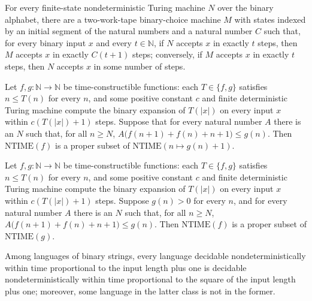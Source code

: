 \begin{theorem}
\label{Turing.FinNDTM.exists_codeNDTM_accepts_linear}
\leanok
{}
For every finite-state nondeterministic Turing machine $N$ over the binary alphabet,
there are a two-work-tape binary-choice machine $M$ with states indexed by an initial
segment of the natural numbers and a natural number $C$ such that, for every binary
input $x$ and every $t\in\mathbb{N}$, if $N$ accepts $x$ in exactly $t$ steps, then $M$
accepts $x$ in exactly $C(t+1)$ steps; conversely, if $M$ accepts $x$ in exactly $t$
steps, then $N$ accepts $x$ in some number of steps.
\end{theorem}

\begin{theorem}
\label{Complexity.ntime_hierarchy}
\leanok
{}
Let $f,g:\mathbb{N}\to\mathbb{N}$ be time-constructible functions: each $T\in\{f,g\}$
satisfies $n\le T(n)$ for every $n$, and some positive constant $c$ and finite
deterministic Turing machine compute the binary expansion of $T(|x|)$ on every input $x$
within $c(T(|x|)+1)$ steps. Suppose that for every natural number $A$ there is an $N$
such that, for all $n\ge N$, $A\bigl(f(n+1)+f(n)+n+1\bigr)\le g(n)$. Then
$\mathrm{NTIME}(f)$ is a proper subset of $\mathrm{NTIME}(n\mapsto g(n)+1)$.
\end{theorem}

\begin{theorem}
\label{Complexity.ntime_hierarchy_of_pos}
\leanok
{}
Let $f,g:\mathbb{N}\to\mathbb{N}$ be time-constructible functions: each $T\in\{f,g\}$
satisfies $n\le T(n)$ for every $n$, and some positive constant $c$ and finite
deterministic Turing machine compute the binary expansion of $T(|x|)$ on every input $x$
within $c(T(|x|)+1)$ steps. Suppose $g(n)>0$ for every $n$, and for every natural number
$A$ there is an $N$ such that, for all $n\ge N$, $A\bigl(f(n+1)+f(n)+n+1\bigr)\le g(n)$.
Then $\mathrm{NTIME}(f)$ is a proper subset of $\mathrm{NTIME}(g)$.
\end{theorem}

\begin{theorem}
\label{Complexity.NTIME_linear_ssubset_square}
\leanok
{}
Among languages of binary strings, every language decidable nondeterministically within
time proportional to the input length plus one is decidable nondeterministically within
time proportional to the square of the input length plus one; moreover, some language in
the latter class is not in the former.
\end{theorem}

